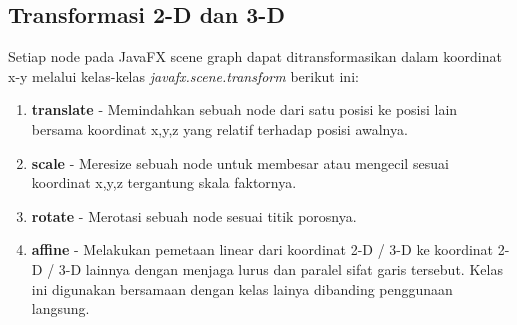 \subsection{Transformasi 2-D dan 3-D}
\label{subs:Layout}
Setiap node pada JavaFX scene graph dapat ditransformasikan dalam koordinat x-y melalui kelas-kelas \textit{javafx.scene.transform} berikut ini:\cite{javafx}
\begin{enumerate}
	\item \textbf{translate} - Memindahkan sebuah node dari satu posisi ke posisi lain bersama koordinat x,y,z yang relatif terhadap posisi awalnya.
	\item \textbf{scale} - Meresize sebuah node untuk membesar atau mengecil sesuai koordinat x,y,z tergantung skala faktornya.
	\item \textbf{rotate} - Merotasi sebuah node sesuai titik porosnya.
	\item \textbf{affine} - Melakukan pemetaan linear dari koordinat 2-D / 3-D ke koordinat 2-D / 3-D lainnya dengan menjaga lurus dan paralel sifat garis tersebut. Kelas ini digunakan bersamaan dengan kelas lainya dibanding penggunaan langsung.
\end{enumerate}

